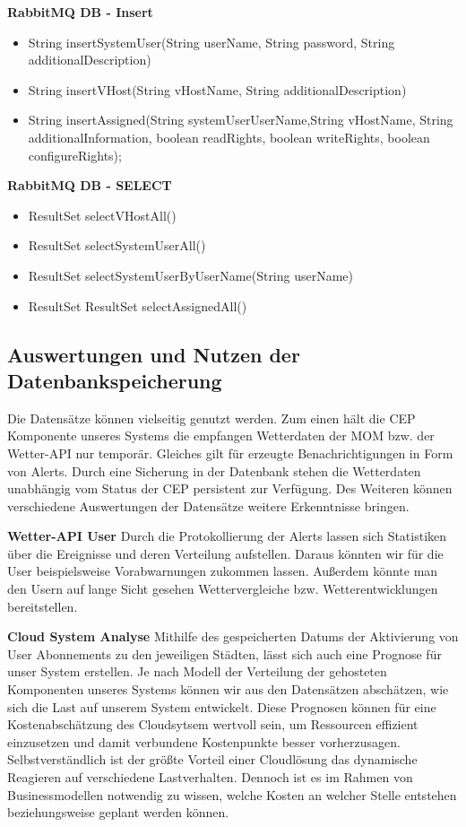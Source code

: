 {\bf RabbitMQ DB - Insert }
\begin{itemize}
\item String insertSystemUser(String userName, String password, String additionalDescription)
\item String insertVHost(String vHostName, String additionalDescription)
\item String insertAssigned(String systemUserUserName,String vHostName, String additionalInformation, boolean readRights, boolean writeRights, boolean configureRights);
\end{itemize}

{\bf RabbitMQ DB - SELECT }
\begin{itemize}
\item ResultSet selectVHostAll()
\item ResultSet selectSystemUserAll()
\item ResultSet selectSystemUserByUserName(String userName)
\item ResultSet ResultSet selectAssignedAll()
\end{itemize}



\subsection{Auswertungen und Nutzen der Datenbankspeicherung}
Die Datensätze können vielseitig genutzt werden. Zum einen hält die CEP Komponente unseres Systems die empfangen Wetterdaten der MOM bzw. der Wetter-API nur temporär. Gleiches gilt für erzeugte Benachrichtigungen in Form von Alerts.
Durch eine Sicherung in der Datenbank stehen die Wetterdaten unabhängig vom Status der CEP persistent zur Verfügung. 
Des Weiteren können verschiedene Auswertungen der Datensätze weitere Erkenntnisse bringen. 

\textbf{Wetter-API User}
Durch die Protokollierung der Alerts lassen sich Statistiken über die Ereignisse und deren Verteilung aufstellen. Daraus könnten wir für die User beispielsweise Vorabwarnungen zukommen lassen. Außerdem könnte man den Usern auf lange Sicht gesehen Wettervergleiche bzw. Wetterentwicklungen bereitstellen.

\textbf{Cloud System Analyse}
Mithilfe des gespeicherten Datums der Aktivierung  von User Abonnements zu den jeweiligen Städten, lässt sich auch eine Prognose für unser System erstellen. Je nach Modell der Verteilung der gehosteten Komponenten unseres Systems  können wir aus den Datensätzen abschätzen, wie sich die Last auf unserem System entwickelt. 
Diese Prognosen können für eine Kostenabschätzung des Cloudsytsem wertvoll sein, um Ressourcen effizient einzusetzen und damit verbundene Kostenpunkte besser vorherzusagen.
Selbstverständlich ist der größte Vorteil einer Cloudlösung das dynamische Reagieren auf verschiedene Lastverhalten. Dennoch ist es im Rahmen von Businessmodellen notwendig zu wissen, welche Kosten an welcher Stelle entstehen beziehungsweise geplant werden können.

